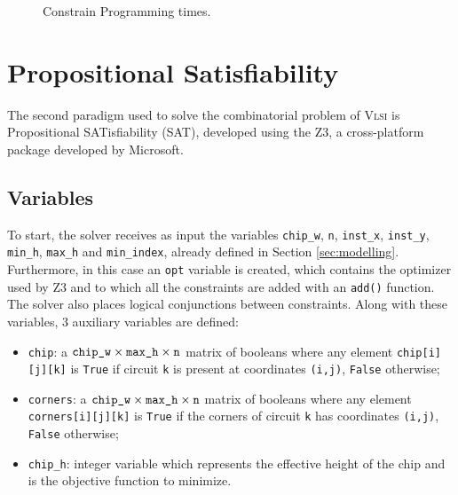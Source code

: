 \documentclass[a4paper, 12pt]{article}
\begin{document}
\begin{figure}
    \centering
        \caption{Constrain Programming times.}
    \label{fig:cp}  
\end{figure}



\clearpage

\section{Propositional Satisfiability}
The second paradigm used to solve the combinatorial problem of \textsc{Vlsi} is Propositional SATisfiability (SAT), developed using the Z3, a cross-platform package developed by Microsoft.



\subsection{Variables}\label{sec:sat-variables}
To start, the solver receives as input the variables \verb|chip_w|, \verb|n|, \verb|inst_x|, \verb|inst_y|, \verb|min_h|, \verb|max_h| and \verb|min_index|, already defined in Section \ref{sec:modelling}. Furthermore, in this case an \verb|opt| variable is created, which contains the optimizer used by Z3 and to which all the constraints are added with an \verb|add()| function. The solver also places logical conjunctions between constraints. Along with these variables, 3 auxiliary variables are defined:
\begin{itemize}
	\item \verb|chip|: a $\texttt{chip\symbol{95}w} \times \texttt{max\symbol{95}h} \times \texttt{n}$ matrix of booleans where any element \verb|chip[i][j][k]| is \verb|True| if circuit \verb|k| is present at coordinates \verb|(i,j)|, \verb|False| otherwise;
	\item \verb|corners|: a $\texttt{chip\symbol{95}w} \times \texttt{max\symbol{95}h} \times \texttt{n}$ matrix of booleans where any element \verb|corners[i][j][k]| is \verb|True| if the corners of circuit \verb|k| has coordinates \verb|(i,j)|, \verb|False| otherwise;
	\item \verb|chip_h|: integer variable which represents the effective height of the chip and is the objective function to minimize. 
\end{itemize}
\end{document}

